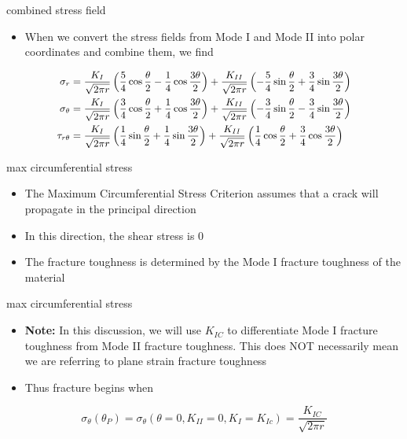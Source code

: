 \documentclass[
  letterpaper,
  ignorenonframetext,
  aspectratio=43,
  handout,
  12pt]{beamer}
\providecommand{\tightlist}{%
  \setlength{\itemsep}{0pt}\setlength{\parskip}{0pt}}
\providecommand{\tightlist}{%
\setlength{\itemsep}{0pt}\setlength{\parskip}{0pt}}
\begin{document}
\begin{frame}{combined stress field}
\protect\hypertarget{combined-stress-field}{}
\begin{itemize}
\tightlist
\item
  When we convert the stress fields from Mode I and Mode II into polar
  coordinates and combine them, we find
\end{itemize}

\[\small{\begin{aligned}
  \sigma_r &= \frac{K_I}{\sqrt{2\pi r}} \left(\frac{5}{4}\cos \frac{\theta}{2} - \frac{1}{4}\cos \frac{3\theta}{2}\right) + \frac{K_{II}}{\sqrt{2\pi r}}\left(-\frac{5}{4}\sin \frac{\theta}{2} + \frac{3}{4}\sin \frac{3\theta}{2}\right)\\
  \sigma_\theta &= \frac{K_I}{\sqrt{2\pi r}} \left(\frac{3}{4}\cos \frac{\theta}{2} + \frac{1}{4}\cos \frac{3\theta}{2}\right) + \frac{K_{II}}{\sqrt{2\pi r}}\left(-\frac{3}{4}\sin \frac{\theta}{2} - \frac{3}{4}\sin \frac{3\theta}{2}\right)\\
  \tau_{r\theta} &= \frac{K_I}{\sqrt{2\pi r}} \left(\frac{1}{4}\sin \frac{\theta}{2} + \frac{1}{4}\sin \frac{3\theta}{2}\right) + \frac{K_{II}}{\sqrt{2\pi r}}\left(\frac{1}{4}\cos \frac{\theta}{2} + \frac{3}{4}\cos \frac{3\theta}{2}\right)
\end{aligned} }\]
\end{frame}

\begin{frame}{max circumferential stress}
\protect\hypertarget{max-circumferential-stress}{}
\begin{itemize}
\tightlist
\item
  The Maximum Circumferential Stress Criterion assumes that a crack will
  propagate in the principal direction
\item
  In this direction, the shear stress is 0
\item
  The fracture toughness is determined by the Mode I fracture toughness
  of the material
\end{itemize}
\end{frame}

\begin{frame}{max circumferential stress}
\protect\hypertarget{max-circumferential-stress-1}{}
\begin{itemize}
\tightlist
\item
  \textbf{Note:} In this discussion, we will use \(K_{IC}\) to
  differentiate Mode I fracture toughness from Mode II fracture
  toughness. This does NOT necessarily mean we are referring to plane
  strain fracture toughness
\item
  Thus fracture begins when
\end{itemize}

\[\sigma_{\theta}(\theta_P) = \sigma_\theta(\theta=0, K_{II}=0, K_I = K_{Ic}) = \frac{K_{IC}}{\sqrt{2\pi r}}\]
\end{frame}
\end{document}
